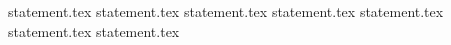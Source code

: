 {statement.tex}
{statement.tex}
{statement.tex}
{statement.tex}
{statement.tex}
{statement.tex}
{statement.tex}